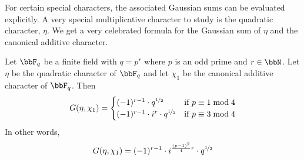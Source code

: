 For certain special characters, the associated Gaussian sums can be evaluated explicitly. A very special multiplicative character to study is the quadratic character, $\eta$. We get a very celebrated formula for the Gaussian sum of $\eta$ and the canonical additive character. 
\begin{Theorem}{}{}
  Let $\bbF_q$ be a finite field with $q=p^r$ where $p$ is an odd prime and $r\in\bbN$. Let $\eta$ be the quadratic character of $\bbF_q$ and let $\chi_1$ be the canonical additive character of $\bbF_q$. Then $$G(\eta,\chi_1)=\begin{cases}
    (-1)^{r-1}\cdot q^{\nicefrac12} & \text{if }p\equiv 1\bmod 4\\ 
    (-1)^{r-1}\cdot i^{r}\cdot q^{\nicefrac12} & \text{if }p\equiv 3\bmod 4    
  \end{cases}$$
  In other words, $$G(\eta,\chi_1)=(-1)^{r-1}\cdot i^{\frac{(p-1)^2}4 r} \cdot q^{\nicefrac12}$$ 
\end{Theorem}
